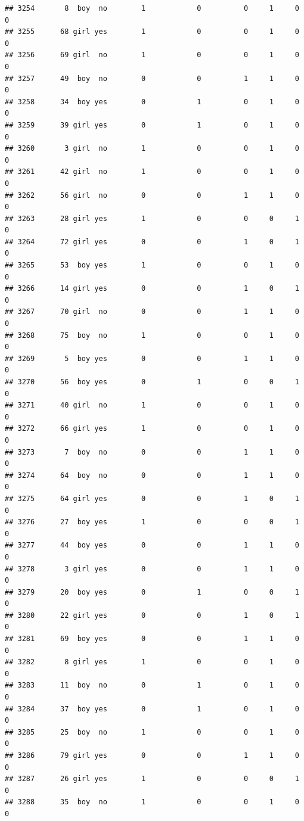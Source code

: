 \documentclass[man]{apa6}
\begin{document}
\begin{verbatim}
## 3254       8  boy  no        1            0          0     1     0     0
## 3255      68 girl yes        1            0          0     1     0     0
## 3256      69 girl  no        1            0          0     1     0     0
## 3257      49  boy  no        0            0          1     1     0     0
## 3258      34  boy yes        0            1          0     1     0     0
## 3259      39 girl yes        0            1          0     1     0     0
## 3260       3 girl  no        1            0          0     1     0     0
## 3261      42 girl  no        1            0          0     1     0     0
## 3262      56 girl  no        0            0          1     1     0     0
## 3263      28 girl yes        1            0          0     0     1     0
## 3264      72 girl yes        0            0          1     0     1     0
## 3265      53  boy yes        1            0          0     1     0     0
## 3266      14 girl yes        0            0          1     0     1     0
## 3267      70 girl  no        0            0          1     1     0     0
## 3268      75  boy  no        1            0          0     1     0     0
## 3269       5  boy yes        0            0          1     1     0     0
## 3270      56  boy yes        0            1          0     0     1     0
## 3271      40 girl  no        1            0          0     1     0     0
## 3272      66 girl yes        1            0          0     1     0     0
## 3273       7  boy  no        0            0          1     1     0     0
## 3274      64  boy  no        0            0          1     1     0     0
## 3275      64 girl yes        0            0          1     0     1     0
## 3276      27  boy yes        1            0          0     0     1     0
## 3277      44  boy yes        0            0          1     1     0     0
## 3278       3 girl yes        0            0          1     1     0     0
## 3279      20  boy yes        0            1          0     0     1     0
## 3280      22 girl yes        0            0          1     0     1     0
## 3281      69  boy yes        0            0          1     1     0     0
## 3282       8 girl yes        1            0          0     1     0     0
## 3283      11  boy  no        0            1          0     1     0     0
## 3284      37  boy yes        0            1          0     1     0     0
## 3285      25  boy  no        1            0          0     1     0     0
## 3286      79 girl yes        0            0          1     1     0     0
## 3287      26 girl yes        1            0          0     0     1     0
## 3288      35  boy  no        1            0          0     1     0     0

\end{verbatim}
\end{document}
